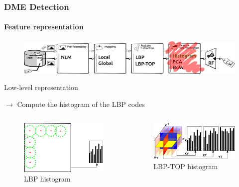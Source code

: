 \documentclass{beamer}
\begin{document}
\begin{frame}
  \frametitle{DME Detection}
  \framesubtitle{Feature representation}
    \begin{figure}
    \centering
    \includegraphics[width=.5\textwidth]{./images/ml-r1.png}
  \end{figure}
  \begin{block}{Low-level representation}\footnotesize
    \begin{center}
      $\rightarrow$ Compute the histogram of the LBP codes
    \end{center}
    \vspace{-.6cm}
    \begin{columns}
      \begin{column}{.5\linewidth}
        \begin{figure}
          \centering
          \includegraphics[width=.4\textwidth]{./images/lbp-hist.png}
          \caption{LBP histogram}
        \end{figure}
      \end{column}
      \begin{column}{.5\linewidth}
        \begin{figure}
          \centering
          \includegraphics[width=.5\textwidth]{./images/LBPTOP_fig.png}
          \caption{LBP-TOP histogram}
        \end{figure}
      \end{column}
    \end{columns}
  \end{block}
\end{frame}
\end{document}
